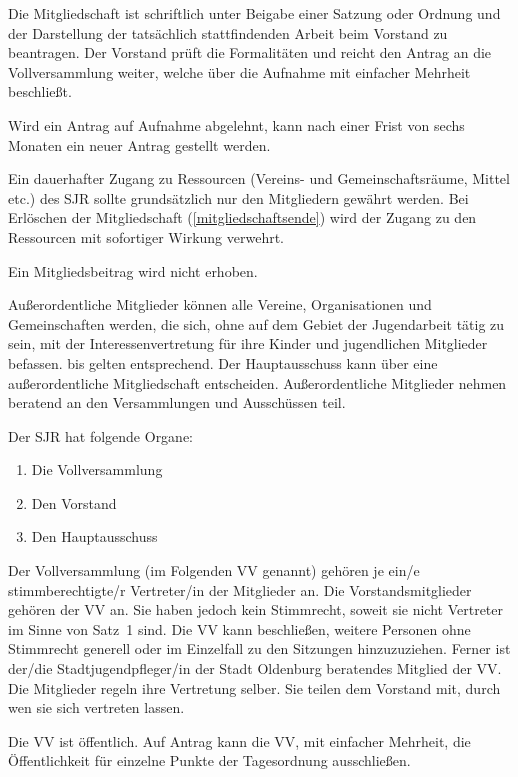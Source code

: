 \documentclass[10pt,a4paper,oneside,parskip=half]{scrartcl}
\begin{document}
\begin{contract}
Die Mitgliedschaft ist schriftlich unter Beigabe einer Satzung oder Ordnung und der Darstellung der tatsächlich stattfindenden Arbeit beim Vorstand zu beantragen. Der Vorstand prüft die Formalitäten und reicht den Antrag an die Vollversammlung weiter, welche über die Aufnahme mit einfacher Mehrheit beschließt.

Wird ein Antrag auf Aufnahme abgelehnt, kann nach einer Frist von sechs Monaten ein neuer Antrag gestellt werden.

Ein dauerhafter Zugang zu Ressourcen (Vereins- und Gemeinschaftsräume, Mittel etc.) des SJR sollte grundsätzlich nur den Mitgliedern gewährt werden. Bei Erlöschen der Mitgliedschaft (\ref{mitgliedschaftsende}) wird der Zugang zu den Ressourcen mit sofortiger Wirkung verwehrt.

Ein Mitgliedsbeitrag wird nicht erhoben.\label{mitgliedschaft_beitrag}

Außerordentliche Mitglieder können alle Vereine, Organisationen und Gemeinschaften werden, die sich, ohne auf dem Gebiet der Jugendarbeit tätig zu sein, mit der Interessenvertretung für ihre Kinder und jugendlichen Mitglieder befassen.  bis  gelten entsprechend. Der Hauptausschuss kann über eine außerordentliche Mitgliedschaft entscheiden. Außerordentliche Mitglieder nehmen beratend an den Versammlungen und Ausschüssen teil.

Der SJR hat folgende Organe:
\begin{enumerate}
\item Die Vollversammlung
\item Den Vorstand
\item Den Hauptausschuss
\end{enumerate}

Der Vollversammlung (im Folgenden VV genannt) gehören je ein/e stimmberechtigte/r Vertreter/in der Mitglieder an. Die Vorstandsmitglieder gehören der VV an. Sie haben jedoch kein Stimmrecht, soweit sie nicht Vertreter im Sinne von Satz~1 sind. Die VV kann beschließen, weitere Personen ohne Stimmrecht generell oder im Einzelfall zu den Sitzungen hinzuzuziehen. Ferner ist der/die Stadtjugendpfleger/in der Stadt Oldenburg beratendes Mitglied der VV. Die Mitglieder regeln ihre Vertretung selber. Sie teilen dem Vorstand mit, durch wen sie sich vertreten lassen.

Die VV ist öffentlich. Auf Antrag kann die VV, mit einfacher Mehrheit, die Öffentlichkeit für einzelne Punkte der Tagesordnung ausschließen.


\end{contract}
\end{document}
